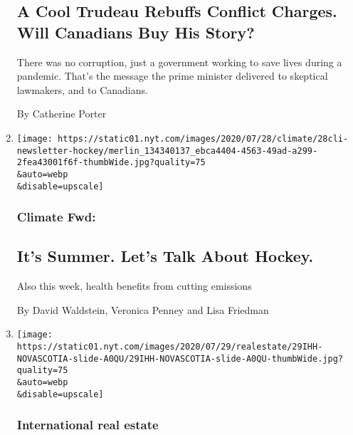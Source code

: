 \begin{enumerate}
  \hypertarget{a-cool-trudeau-rebuffs-conflict-charges-will-canadians-buy-his-story}{%
  \subsection{A Cool Trudeau Rebuffs Conflict Charges. Will Canadians
  Buy His
  Story?}\label{a-cool-trudeau-rebuffs-conflict-charges-will-canadians-buy-his-story}}

  There was no corruption, just a government working to save lives
  during a pandemic. That's the message the prime minister delivered to
  skeptical lawmakers, and to Canadians.

  By Catherine Porter
\item
  \href{/2020/07/29/climate/skating-hockey-climate-change.html}{}

  \texttt{[image: https://static01.nyt.com/images/2020/07/28/climate/28cli-newsletter-hockey/merlin\_134340137\_ebca4404-4563-49ad-a299-2fea43001f6f-thumbWide.jpg?quality=75\\\&auto=webp\\\&disable=upscale]}

  \hypertarget{climate-fwd}{%
  \subsubsection{Climate Fwd:}\label{climate-fwd}}

  \hypertarget{its-summer-lets-talk-about-hockey}{%
  \subsection{It's Summer. Let's Talk About
  Hockey.}\label{its-summer-lets-talk-about-hockey}}

  Also this week, health benefits from cutting emissions

  By David Waldstein, Veronica Penney and Lisa Friedman
\item
  \href{/2020/07/29/realestate/house-hunting-in-nova-scotia-a-sprawling-seaside-villa-for-2-million.html}{}

  \texttt{[image: https://static01.nyt.com/images/2020/07/29/realestate/29IHH-NOVASCOTIA-slide-A0QU/29IHH-NOVASCOTIA-slide-A0QU-thumbWide.jpg?quality=75\\\&auto=webp\\\&disable=upscale]}

  \hypertarget{international-real-estate}{%
  \subsubsection{International real
  estate}\label{international-real-estate}}


\end{enumerate}
